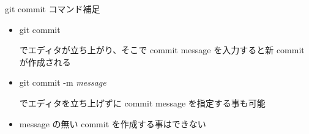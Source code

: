 \begin{frame}[t]{git commit コマンド補足}{}

  \begin{itemize}
  \item git commit

    でエディタが立ち上がり、そこで commit message を入力すると新 commit が作成される
    \vspace{2ex}

  \item git commit -m \textit{message}

    でエディタを立ち上げずに commit message を指定する事も可能
    \vspace{2ex}

  \item message の無い commit を作成する事はできない
  \end{itemize}

\end{frame}
